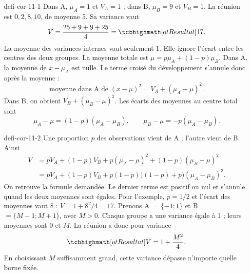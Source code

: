 \begin{blocEdition}{defi-cor-11-1}
Dans A, $\mu_A=1$ et $V_A=1$ ; dans B, $\mu_B=9$ et $V_B=1$.
La réunion est $0,2,8,10$, de moyenne 5. Sa variance vaut
\[V=\frac{25+9+9+25}{4}=\res{17}.\]
La moyenne des variances internes vaut seulement 1. Elle ignore l'écart entre les centres des deux groupes.
La moyenne totale est $\mu=p\mu_A+(1-p)\mu_B$.
Dans A, la moyenne de $x-\mu_A$ est nulle. Le terme croisé du développement
s'annule donc après la moyenne :
\[\text{moyenne dans A de }(x-\mu)^2=V_A+(\mu_A-\mu)^2.\]
Dans B, on obtient $V_B+(\mu_B-\mu)^2$.
Les écarts des moyennes au centre total sont
\[\mu_A-\mu=(1-p)(\mu_A-\mu_B),\qquad
\mu_B-\mu=-p(\mu_A-\mu_B).\]
\end{blocEdition}

\begin{blocEdition}{defi-cor-11-2}
Une proportion $p$ des observations vient de A ; l'autre vient de B. Ainsi
\begin{align*}
V&=pV_A+(1-p)V_B+p(\mu_A-\mu)^2+(1-p)(\mu_B-\mu)^2\\
 &=pV_A+(1-p)V_B+p(1-p)\bigl((1-p)+p\bigr)(\mu_A-\mu_B)^2.
\end{align*}
On retrouve la formule demandée. Le dernier terme est positif ou nul et s'annule
quand les deux moyennes sont égales.
Pour l'exemple, $p=1/2$ et l'écart des moyennes vaut 8 : $V=1+8^2/4=17$.
Prenons A $=\{-1;1\}$ et B $=\{M-1;M+1\}$, avec $M>0$.
Chaque groupe a une variance égale à 1 ; leurs moyennes sont 0 et $M$.
La réunion a donc pour variance
\[\res{V=1+\frac{M^2}{4}}.\]
En choisissant $M$ suffisamment grand, cette variance dépasse n'importe quelle borne fixée.
\label{figedition-defi-cor-11-2-1}
\end{blocEdition}

